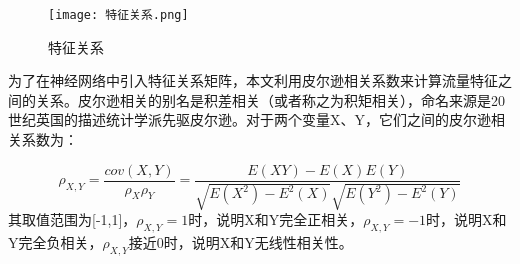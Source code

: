 \begin{figure}
  \centering
  \texttt{[image: 特征关系.png]}
  \caption{特征关系}
  \label{fig:特征关系}
\end{figure}

为了在神经网络中引入特征关系矩阵，本文利用皮尔逊相关系数来计算流量特征之间的关系。皮尔逊相关的别名是积差相关（或者称之为积矩相关），命名来源是20 世纪英国的描述统计学派先驱皮尔逊。对于两个变量X、Y，它们之间的皮尔逊相关系数为：


\begin{equation}
  \rho_{X,Y} = \frac{cov(X,Y)}{\rho_X\rho_Y}=\frac{E(XY)-E(X)E(Y)}{\sqrt{E(X^2)-E^2(X)}\sqrt{E(Y^2)-E^2(Y)}}
\end{equation}
其取值范围为[-1,1]，$\rho_{X,Y}=1$时，说明X和Y完全正相关，$\rho_{X,Y}=-1$时，说明X和Y完全负相关，$\rho_{X,Y}$接近0时，说明X和Y无线性相关性。





